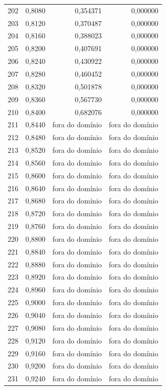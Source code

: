 \begin{tabular}{lrrr}
202 & 0,8080 & 0,354371 & 0,000000 \\
203 & 0,8120 & 0,370487 & 0,000000 \\
204 & 0,8160 & 0,388023 & 0,000000 \\
205 & 0,8200 & 0,407691 & 0,000000 \\
206 & 0,8240 & 0,430922 & 0,000000 \\
207 & 0,8280 & 0,460452 & 0,000000 \\
208 & 0,8320 & 0,501878 & 0,000000 \\
209 & 0,8360 & 0,567730 & 0,000000 \\
210 & 0,8400 & 0,682076 & 0,000000 \\
211 & 0,8440 & fora do domínio & fora do domínio \\
212 & 0,8480 & fora do domínio & fora do domínio \\
213 & 0,8520 & fora do domínio & fora do domínio \\
214 & 0,8560 & fora do domínio & fora do domínio \\
215 & 0,8600 & fora do domínio & fora do domínio \\
216 & 0,8640 & fora do domínio & fora do domínio \\
217 & 0,8680 & fora do domínio & fora do domínio \\
218 & 0,8720 & fora do domínio & fora do domínio \\
219 & 0,8760 & fora do domínio & fora do domínio \\
220 & 0,8800 & fora do domínio & fora do domínio \\
221 & 0,8840 & fora do domínio & fora do domínio \\
222 & 0,8880 & fora do domínio & fora do domínio \\
223 & 0,8920 & fora do domínio & fora do domínio \\
224 & 0,8960 & fora do domínio & fora do domínio \\
225 & 0,9000 & fora do domínio & fora do domínio \\
226 & 0,9040 & fora do domínio & fora do domínio \\
227 & 0,9080 & fora do domínio & fora do domínio \\
228 & 0,9120 & fora do domínio & fora do domínio \\
229 & 0,9160 & fora do domínio & fora do domínio \\
230 & 0,9200 & fora do domínio & fora do domínio \\
231 & 0,9240 & fora do domínio & fora do domínio \\

\end{tabular}
